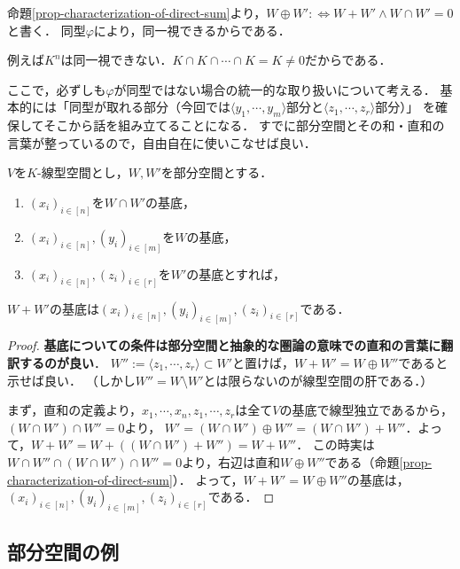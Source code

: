 \documentclass[uplatex, dvipdfmx]{jsreport}
\begin{document}
\begin{notation}
    命題\ref{prop-characterization-of-direct-sum}より，$W\oplus W':\Leftrightarrow W+W'\land W\cap W'=0$と書く．
    同型$\varphi$により，同一視できるからである．
\end{notation}

\begin{example}[いろいろな直和]
    例えば$K^n$は同一視できない．$K\cap K\cap\cdots\cap K=K\ne 0$だからである．
\end{example}

ここで，必ずしも$\varphi$が同型ではない場合の統一的な取り扱いについて考える．
基本的には「同型が取れる部分（今回では$\langle y_1,\cdots,y_m\rangle$部分と$\langle z_1,\cdots,z_r\rangle$部分）」
を確保してそこから話を組み立てることになる．
すでに部分空間とその和・直和の言葉が整っているので，自由自在に使いこなせば良い．

\begin{corollary}\label{cor-basis}
    $V$を$K$-線型空間とし，$W,W'$を部分空間とする．
    \begin{enumerate}
        \item $(x_i)_{i\in[n]}$を$W\cap W'$の基底，
        \item $(x_i)_{i\in[n]},(y_i)_{i\in[m]}$を$W$の基底，
        \item $(x_i)_{i\in[n]},(z_i)_{i\in[r]}$を$W'$の基底とすれば，
    \end{enumerate}
    $W+W'$の基底は$(x_i)_{i\in[n]},(y_i)_{i\in[m]},(z_i)_{i\in[r]}$である．
\end{corollary}
\begin{proof}
    \textbf{基底についての条件は部分空間と抽象的な圏論の意味での直和の言葉に翻訳するのが良い}．
    $W'':=\langle z_1,\cdots,z_r\rangle\subset W'$と置けば，$W+W'=W\oplus W''$であると示せば良い．
    （しかし$W''=W\setminus W'$とは限らないのが線型空間の肝である．）

    まず，直和の定義より，$x_1,\cdots,x_n,z_1,\cdots,z_r$は全て$V$の基底で線型独立であるから，$(W\cap W')\cap W''=0$より，
    $W'=(W\cap W')\oplus W''= (W\cap W')+ W''$．よって，$W+W'=W+((W\cap W')+ W'')=W+W''$．
    この時実は$W\cap W''\cap (W\cap W')\cap W''=0$より，右辺は直和$W\oplus W''$である（命題\ref{prop-characterization-of-direct-sum}）．
    よって，$W+W'=W\oplus W''$の基底は，$(x_i)_{i\in[n]},(y_i)_{i\in[m]},(z_i)_{i\in[r]}$である．
\end{proof}

\subsection{部分空間の例}
\end{document}
